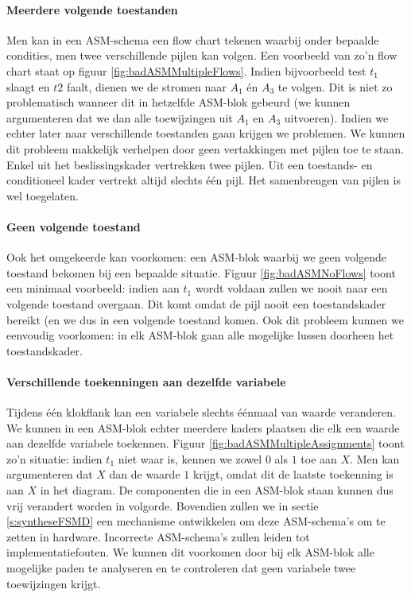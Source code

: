 \paragraph{Meerdere volgende toestanden}Men kan in een ASM-schema een flow chart tekenen waarbij onder bepaalde condities, men twee verschillende pijlen kan volgen. Een voorbeeld van zo'n flow chart staat op figuur \ref{fig:badASMMultipleFlows}. Indien bijvoorbeeld test $t_1$ slaagt en $t2$ faalt, dienen we de stromen naar $A_1$ \'en $A_3$ te volgen. Dit is niet zo problematisch wanneer dit in hetzelfde ASM-blok gebeurd (we kunnen argumenteren dat we dan alle toewijzingen uit $A_1$ en $A_3$ uitvoeren). Indien we echter later naar verschillende toestanden gaan krijgen we problemen. We kunnen dit probleem makkelijk verhelpen door geen vertakkingen met pijlen toe te staan. Enkel uit het beslissingskader vertrekken twee pijlen. Uit een toestands- en conditioneel kader vertrekt altijd slechts \'e\'en pijl. Het samenbrengen van pijlen is wel toegelaten.
\paragraph{Geen volgende toestand}Ook het omgekeerde kan voorkomen: een ASM-blok waarbij we geen volgende toestand bekomen bij een bepaalde situatie. Figuur \ref{fig:badASMNoFlows} toont een minimaal voorbeeld: indien aan $t_1$ wordt voldaan zullen we nooit naar een volgende toestand overgaan. Dit komt omdat de pijl nooit een toestandskader bereikt (en we dus in een volgende toestand komen. Ook dit probleem kunnen we eenvoudig voorkomen: in elk ASM-blok gaan alle mogelijke lussen doorheen het toestandskader.
\paragraph{Verschillende toekenningen aan dezelfde variabele} Tijdens \'e\'en klokflank kan een variabele slechts \'e\'enmaal van waarde veranderen. We kunnen in een ASM-blok echter meerdere kaders plaatsen die elk een waarde aan dezelfde variabele toekennen. Figuur \ref{fig:badASMMultipleAssignments} toont zo'n situatie: indien $t_1$ niet waar is, kennen we zowel $0$ als $1$ toe aan $X$. Men kan argumenteren dat $X$ dan de waarde $1$ krijgt, omdat dit de laatste toekenning is aan $X$ in het diagram. De componenten die in een ASM-blok staan kunnen dus vrij verandert worden in volgorde. Bovendien zullen we in sectie \ref{s:syntheseFSMD} een mechanisme ontwikkelen om deze ASM-schema's om te zetten in hardware. Incorrecte ASM-schema's zullen leiden tot implementatiefouten. We kunnen dit voorkomen door bij elk ASM-blok alle mogelijke paden te analyseren en te controleren dat geen variabele twee toewijzingen krijgt.
